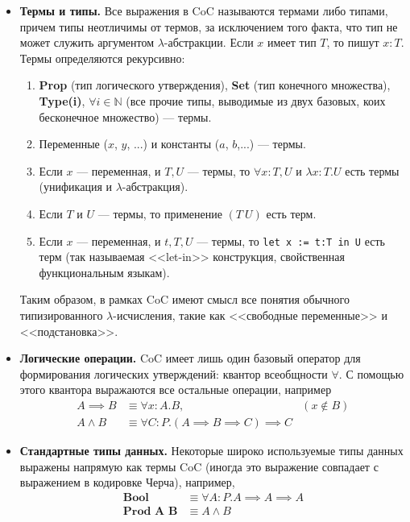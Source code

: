 \begin{itemize}
\item \textbf{Термы и типы.} Все выражения в CoC называются термами либо типами, причем типы неотличимы от термов, за исключением того факта, что тип не может служить аргументом $\lambda$-абстракции. Если $x$ имеет тип $T$, то пишут $x:T$. Термы определяются рекурсивно:
\begin{enumerate}
\item \textbf{Prop} (тип логического утверждения), \textbf{Set} (тип конечного множества), \textbf{Type(i)}, $\forall i \in \mathbb{N}$ (все прочие типы, выводимые из двух базовых, коих бесконечное множество) --- термы.
\item Переменные ($x$, $y$, ...) и константы ($a$, $b$,...) --- термы.
\item Если $x$ --- переменная, и $T, U$ --- термы, то $\forall x : T, U$ и $\lambda x : T. U$ есть термы (унификация и $\lambda$-абстракция).
\item Если $T$ и $U$ --- термы, то применение $(T\ U)$ есть терм.
\item Если $x$ --- переменная, и $t, T, U$ --- термы, то \texttt{let x := t:T in U} есть терм (так называемая <<let-in>> конструкция, свойственная функциональным языкам).
\end{enumerate}
Таким образом, в рамках CoC имеют смысл все понятия обычного типизированного $\lambda$-исчисления, такие как <<свободные переменные>> и <<подстановка>>.

\item \textbf{Логические операции.} CoC имеет лишь один базовый оператор для формирования логических утверждений: квантор всеобщности $\forall$. С помощью этого квантора выражаются все остальные операции, например
\begin{align*}
A \implies B &\equiv \forall x: A.B, & (x \notin B) \\
A \wedge B &\equiv \forall C : P.(A \implies B \implies C) \implies C &
\end{align*}
\item \textbf{Стандартные типы данных.} Некоторые широко используемые типы данных выражены напрямую как термы CoC (иногда это выражение совпадает с выражением в кодировке Черча), например,
\begin{align*}
\textbf{Bool} & \equiv \forall A:P.A \implies A \implies A \\
\textbf{Prod A B} & \equiv A \wedge B
\end{align*}
\end{itemize}

